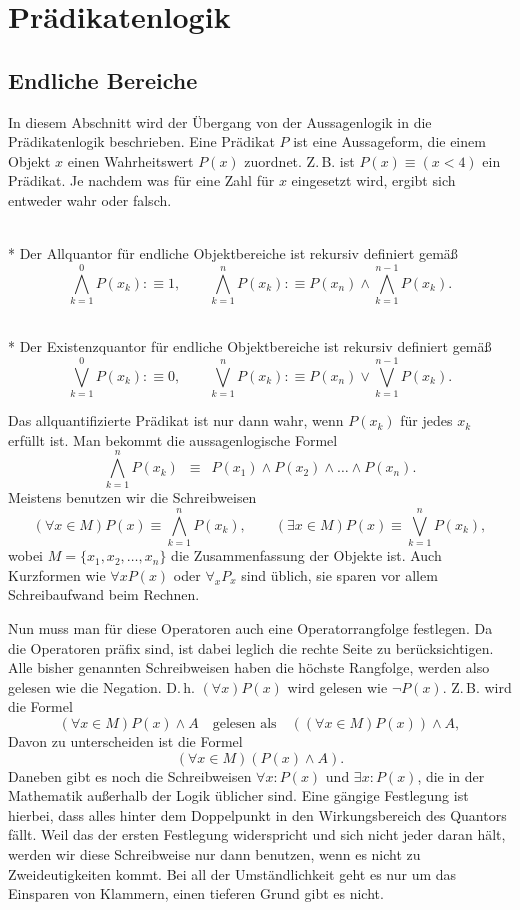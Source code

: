 \newpage
\section{Prädikatenlogik}
\subsection{Endliche Bereiche}
In diesem Abschnitt wird der Übergang von der Aussagenlogik in
die Prädikatenlogik beschrieben. Eine Prädikat $P$ ist eine Aussageform,
die einem Objekt $x$ einen Wahrheitswert $P(x)$ zuordnet. Z.\,B.
ist $P(x)\equiv (x<4)$ ein Prädikat. Je nachdem was für eine Zahl
für $x$ eingesetzt wird, ergibt sich entweder wahr oder falsch.

\begin{Definition}[Allquantor]\mbox{}\\*
Der Allquantor für endliche Objektbereiche
ist rekursiv definiert gemäß%
\[\bigwedge_{k=1}^0 P(x_k) :\equiv 1,\qquad
\bigwedge_{k=1}^n P(x_k) :\equiv P(x_n)\land\bigwedge_{k=1}^{n-1} P(x_k).\]
\end{Definition}

\begin{Definition}[Existenzquantor]\mbox{}\\*
Der Existenzquantor für endliche Objektbereiche
ist rekursiv definiert gemäß%
\[\bigvee_{k=1}^0 P(x_k) :\equiv 0,\qquad
\bigvee_{k=1}^n P(x_k) :\equiv P(x_n)\lor\bigvee_{k=1}^{n-1} P(x_k).\]
\end{Definition}

\noindent
Das allquantifizierte Prädikat ist nur dann wahr, wenn $P(x_k)$ für
jedes $x_k$ erfüllt ist. Man bekommt die aussagenlogische Formel%
\[\bigwedge_{k=1}^n P(x_k)
\enspace\equiv\enspace P(x_1)\land P(x_2)\land\ldots\land P(x_n).\]
Meistens benutzen wir die Schreibweisen
\[(\forall x\in M)P(x) \equiv \bigwedge_{k=1}^n P(x_k),\qquad
(\exists x\in M)P(x) \equiv \bigvee_{k=1}^n P(x_k),\]
wobei $M=\{x_1,x_2,\ldots,x_n\}$ die Zusammenfassung
der Objekte ist. Auch Kurzformen wie $\forall xP(x)$ oder
$\forall_x P_x$ sind üblich, sie sparen vor allem Schreibaufwand
beim Rechnen.

Nun muss man für diese Operatoren auch eine Operatorrangfolge
festlegen. Da die Operatoren präfix sind, ist dabei leglich die
rechte Seite zu berücksichtigen. Alle bisher genannten Schreibweisen
haben die höchste Rangfolge, werden also gelesen wie die Negation.
D.\,h. $(\forall x)P(x)$ wird gelesen wie $\neg P(x)$. Z.\,B. wird
die Formel
\[(\forall x\in M)P(x)\land A\quad
\text{gelesen als}\quad
((\forall x\in M)P(x))\land A,\]
Davon zu unterscheiden ist die Formel
\[(\forall x\in M)(P(x)\land A).\]
Daneben gibt es noch die Schreibweisen $\forall x\colon P(x)$ und
$\exists x\colon P(x)$, die in der Mathematik außerhalb der Logik
üblicher sind. Eine gängige Festlegung ist hierbei, dass alles hinter
dem Doppelpunkt in den Wirkungsbereich des Quantors fällt. Weil das
der ersten Festlegung widerspricht und sich nicht jeder daran hält,
werden wir diese Schreibweise nur dann benutzen, wenn es nicht
zu Zweideutigkeiten kommt. Bei all der Umständlichkeit geht es nur um
das Einsparen von Klammern, einen tieferen Grund gibt es nicht.

